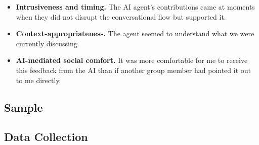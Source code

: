 \begin{itemize}
  \item \textbf{Intrusiveness and timing.}
    The AI agent's contributions came at moments when they did not disrupt the conversational
    flow but supported it.
  \item \textbf{Context-appropriateness.}
    The agent seemed to understand what we were currently discussing.
  \item \textbf{AI-mediated social comfort.}
    It was more comfortable for me to receive this feedback from the AI than if another group
    member had pointed it out to me directly.
\end{itemize}

\subsection{Sample}
\subsection{Data Collection}
